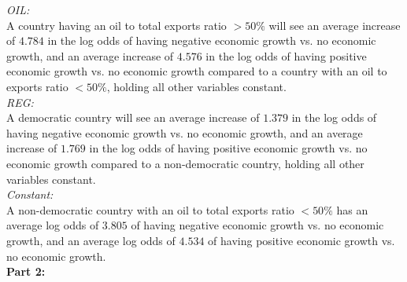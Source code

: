 \documentclass[12pt,letterpaper]{article}
\begin{document}
\noindent \textit{OIL:}\\
\noindent A country having an oil to total exports ratio $>50\%$ will see an average increase of $4.784$ in the log odds of having negative economic growth vs. no economic growth, and an average increase of $4.576$ in the log odds of having positive economic growth vs. no economic growth compared to a  country with an oil to exports ratio $<50\%$, holding all other variables constant.\\

\noindent \textit{REG:}\\
\noindent A democratic country will see an average increase of $1.379$ in the log odds of having negative economic growth vs. no economic growth, and an average increase of $1.769$ in the log odds of having positive economic growth vs. no economic growth compared to a non-democratic country, holding all other variables constant.\\

\noindent \textit{Constant:}\\
\noindent A non-democratic country with an oil to total exports ratio $<50\%$ has an average log odds of $3.805$ of having negative economic growth vs. no economic growth, and an average log odds of $4.534$ of having positive economic growth vs. no economic growth.\\

\noindent \textbf{Part 2:}\\
\end{document}
